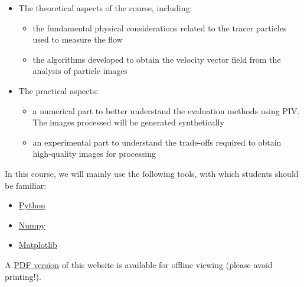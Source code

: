\documentclass[
  english,
  letterpaper,
  numbers=noendperiod,
  DIV=13]{scrreprt}
\providecommand{\tightlist}{%
  \setlength{\itemsep}{0pt}\setlength{\parskip}{0pt}}
\begin{document}
\begin{itemize}
\tightlist
\item
  The theoretical aspects of the course, including:

  \begin{itemize}
  \tightlist
  \item
    the fundamental physical considerations related to the tracer
    particles used to measure the flow
  \item
    the algorithms developed to obtain the velocity vector field from
    the analysis of particle images
  \end{itemize}
\item
  The practical aspects:

  \begin{itemize}
  \tightlist
  \item
    a numerical part to better understand the evaluation methods using
    PIV. The images processed will be generated synthetically
  \item
    an experimental part to understand the trade-offs required to obtain
    high-quality images for processing
  \end{itemize}
\end{itemize}

In this course, we will mainly use the following tools, with which
students should be familiar:

\begin{itemize}
\tightlist
\item
  \href{https://www.python.org/}{Python}
\item
  \href{https://numpy.org}{Numpy}
\item
  \href{https://matplotlib.org}{Matplotlib}
\end{itemize}

\begin{tcolorbox}[enhanced jigsaw, left=2mm, bottomtitle=1mm, rightrule=.15mm, opacitybacktitle=0.6, breakable, toprule=.15mm, bottomrule=.15mm, titlerule=0mm, colback=white, arc=.35mm, leftrule=.75mm, title=\textcolor{quarto-callout-tip-color}{\faLightbulb}\hspace{0.5em}{Tip}, toptitle=1mm, colframe=quarto-callout-tip-color-frame, colbacktitle=quarto-callout-tip-color!10!white, opacityback=0, coltitle=black]

A \href{./Insights-of-Particle-Image-Velocimetry.pdf}{PDF version} of
this website is available for offline viewing (please avoid printing!).

\end{tcolorbox}
\end{document}
